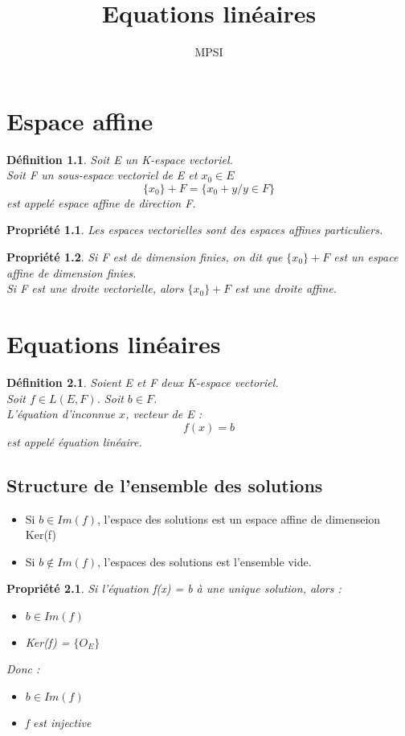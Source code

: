 \documentclass[a4paper,12 pt,oneside]{report}     %
\title{Equations linéaires}
\author{MPSI}
\newtheorem{de}{Définition}
\newtheorem{prop}{Propriété}
\begin{document}
\maketitle
\tableofcontents
\chapter{Espace affine}
\begin{de}
Soit E un K-espace vectoriel.\\
Soit F un sous-espace vectoriel de E et $x_0 \in E$
$$\{ x_0 \} + F = \{x_0 +y / y \in F \}$$
est appelé espace affine de direction F.
\end{de}
\begin{prop}
Les espaces vectorielles sont des espaces affines particuliers.
\end{prop}
\begin{prop}
Si F est de dimension finies, on dit que $\{x_0\} + F$ est un espace affine de dimension finies.\\
Si F est une droite vectorielle, alors $\{x_0\} + F$ est une droite affine.
\end{prop}
\chapter{Equations linéaires}
\begin{de}
Soient E et F deux K-espace vectoriel.\\
Soit $f \in L(E,F)$. Soit $b \in F$.\\
L'équation d'inconnue $x$, vecteur de E :
$$f(x) = b$$
est appelé équation linéaire.
\end{de}
\section{Structure de l'ensemble des solutions}
\begin{itemize}
 \item[$\rightarrow$] Si $b \in Im(f)$, l'espace des solutions est un espace affine de dimenseion Ker(f)
 \item[$\rightarrow$] Si $b \notin Im(f)$, l'espaces des solutions est l'ensemble vide.
\end{itemize}
\begin{prop}
Si l'équation f(x) = b à une unique solution, alors :
\begin{itemize}
 \item[$\rightarrow$]$b \in Im(f)$
 \item[$\rightarrow$]Ker(f) = $\{ O_E \}$
\end{itemize}
Donc : 
\begin{itemize}
 \item[$\rightarrow$]$b \in Im(f)$
 \item[$\rightarrow$]f est injective
\end{itemize}
\end{prop}
\end{document}
